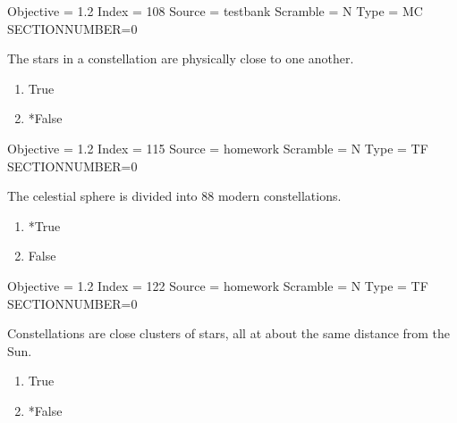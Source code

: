 \documentclass[11pt]{article}
\begin{document}
\begin{enumerate}
\begin{minipage}{\textwidth}
\begin{minipage}{\textwidth}
Objective = 1.2
Index = 108
Source = testbank
Scramble = N
Type = MC
SECTIONNUMBER=0
\end{minipage}
\end{minipage}
\vskip 0.20in

\begin{minipage}{\textwidth}
\begin{minipage}{\textwidth}
\item The stars in a constellation are physically close to one another.
\begin{multicols}{3}
\begin{enumerate} 
\setlength{\itemsep}{1pt} 
\setlength{\parskip}{0pt} 
\setlength{\parsep}{0pt}
\setlength{\multicolsep}{1pt} 
\item True
\item *False
\end{enumerate} 
\vfill 
\end{multicols}

Objective = 1.2
Index = 115
Source = homework
Scramble = N
Type = TF
SECTIONNUMBER=0
\end{minipage}
\end{minipage}
\vskip 0.20in

\begin{minipage}{\textwidth}
\begin{minipage}{\textwidth}
\item The celestial sphere is divided into 88 modern constellations.
\begin{multicols}{3}
\begin{enumerate} 
\setlength{\itemsep}{1pt} 
\setlength{\parskip}{0pt} 
\setlength{\parsep}{0pt}
\setlength{\multicolsep}{1pt} 
\item *True
\item False
\end{enumerate} 
\vfill 
\end{multicols}

Objective = 1.2
Index = 122
Source = homework
Scramble = N
Type = TF
SECTIONNUMBER=0
\end{minipage}
\end{minipage}
\vskip 0.20in

\begin{minipage}{\textwidth}
\begin{minipage}{\textwidth}
\item Constellations are close clusters of stars, all at about the same distance from the Sun.
\begin{multicols}{3}
\begin{enumerate} 
\setlength{\itemsep}{1pt} 
\setlength{\parskip}{0pt} 
\setlength{\parsep}{0pt}
\setlength{\multicolsep}{1pt} 
\item True
\item *False
\end{enumerate} 
\vfill 
\end{multicols}


\end{minipage}
\end{minipage}
\end{enumerate}
\end{document}
